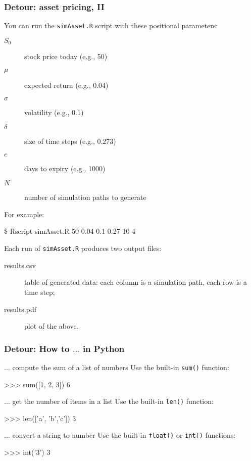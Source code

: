 \documentclass[english,serif,mathserif,xcolor=pdftex,dvipsnames,table]{beamer}
\begin{document}
\begin{frame}[fragile]
  \frametitle{Detour: asset pricing, II}
  \small
  You can run the \texttt{simAsset.R} script with these positional parameters:
  \begin{description}
  \item[$S_0$] stock price today (e.g., 50)
  \item[$\mu$] expected return (e.g., 0.04)
  \item[$\sigma$] volatility (e.g., 0.1)
  \item[$\delta$] size of time steps (e.g., 0.273)
  \item[$e$] days to expiry (e.g., 1000)
  \item[$N$] number of simulation paths to generate
  \end{description}

  For example:
\begin{semiverbatim}
  \$ Rscript simAsset.R 50 0.04 0.1 0.27 10 4
\end{semiverbatim}

  \+ Each run of \texttt{simAsset.R} produces two output files:
  \begin{description}
  \item[results.csv] table of generated data: each column is a simulation path, each row is a time step;
  \item[results.pdf] plot of the above.
  \end{description}
\end{frame}


\begin{frame}[fragile]
  \frametitle{Detour: How to $\ldots$ in Python}
  \small{}

  \begin{describe}{$\ldots$ compute the sum of a list of numbers}
    Use the built-in \lstinline|sum()| function:
    \begin{python}
>>> sum([1, 2, 3])
6
    \end{python}
  \end{describe}

  \begin{describe}{$\ldots$ get the number of items in a list}
    Use the built-in \lstinline|len()| function:
    \begin{python}
>>> len(['a', 'b','c'])
3
    \end{python}
  \end{describe}

  \begin{describe}{$\ldots$ convert a string to number}
    Use the built-in \lstinline|float()| or \lstinline|int()| functions:
    \begin{python}
>>> int('3')
3
    \end{python}
  \end{describe}
\end{frame}
\end{document}
